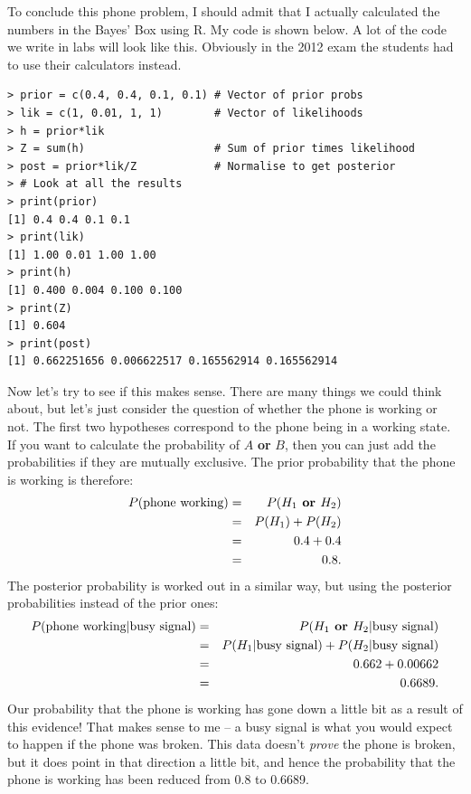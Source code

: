 To conclude this phone problem, I should admit that
I actually calculated the numbers in the Bayes' Box using R. My code is shown
below. A lot of the code we write in labs will look like this. Obviously in the
2012 exam the students had to use their calculators instead.
\begin{framed}
\begin{verbatim}
> prior = c(0.4, 0.4, 0.1, 0.1) # Vector of prior probs
> lik = c(1, 0.01, 1, 1)        # Vector of likelihoods
> h = prior*lik
> Z = sum(h)                    # Sum of prior times likelihood
> post = prior*lik/Z            # Normalise to get posterior
> # Look at all the results
> print(prior)
[1] 0.4 0.4 0.1 0.1
> print(lik)
[1] 1.00 0.01 1.00 1.00
> print(h)
[1] 0.400 0.004 0.100 0.100
> print(Z)
[1] 0.604
> print(post)
[1] 0.662251656 0.006622517 0.165562914 0.165562914
\end{verbatim}
\end{framed}
Now let's try to see if this makes sense. There are many things we could think
about, but let's just consider the question of whether
the phone is working or not. The first two hypotheses correspond to the phone
being in a working state. If you want to calculate the probability of $A$
{\bf or} $B$, then you can just add the probabilities if they are mutually
exclusive. The prior probability that the phone is working is
therefore:
\begin{eqnarray}
P(\textnormal{phone working}) &=& P(H_1 \textbf{ or } H_2)\\
&=& P(H_1) + P(H_2)\\
&=& 0.4 + 0.4\\
&=& 0.8.
\end{eqnarray}
The posterior probability is worked out in a similar way, but using the posterior
probabilities instead of the prior ones:
\begin{eqnarray}
P(\textnormal{phone working}|\textnormal{busy signal}) &=& P(H_1 \textbf{ or } H_2 | \textnormal{busy signal})\\
&=& P(H_1|\textnormal{busy signal}) + P(H_2|\textnormal{busy signal})\\
&=& 0.662 + 0.00662\\
&=& 0.6689.
\end{eqnarray}
Our probability that the phone is working has gone down a little bit as a result of this
evidence! That makes sense to me -- a busy signal is what you would expect to
happen if the phone was broken. This data doesn't {\it prove} the phone is
broken, but it does point in that direction a little bit, and hence the
probability that the phone is working has been reduced from 0.8 to 0.6689.

